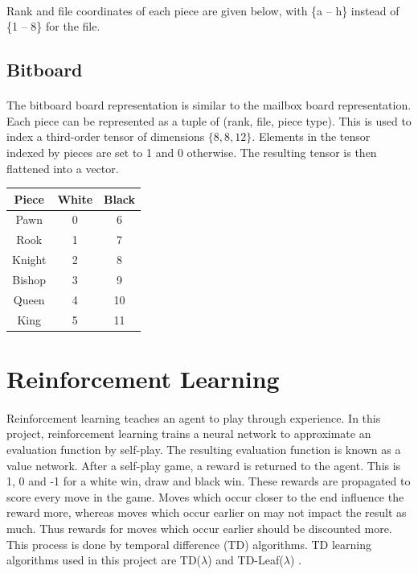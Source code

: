 \documentclass[12pt,a4paper]{book}
\begin{document}
\paragraph{} Rank and file coordinates of each piece are given below, with \{a -- h\} instead of \{1 -- 8\} for the file.

\begin{center}
  \medskip
  \newgame
  \showboard
\end{center}

\subsection{Bitboard}

\paragraph{} The bitboard board representation is similar to the mailbox board representation. Each piece can be represented as a tuple of (rank, file, piece type). This is used to index a third-order tensor of dimensions $\{8, 8, 12\}$. Elements in the tensor indexed by pieces are set to 1 and 0 otherwise. The resulting tensor is then flattened into a vector.

\begin{center}
  \begin{tabular}{c | c  c}
    \hline
    \textbf{Piece} & \textbf{White} & \textbf{Black} \\ \hline
    Pawn & 0 & 6 \\
    Rook & 1 & 7 \\
    Knight & 2 & 8 \\
    Bishop & 3 & 9 \\
    Queen & 4 & 10 \\
    King & 5 & 11 \\
    \hline
  \end{tabular}
\end{center}

\section{Reinforcement Learning}

\paragraph{} Reinforcement learning teaches an agent to play through experience. In this project, reinforcement learning trains a neural network to approximate an evaluation function by self-play. The resulting evaluation function is known as a value network. After a self-play game, a reward is returned to the agent. This is 1, 0 and -1 for a white win, draw and black win. These rewards are propagated to score every move in the game. Moves which occur closer to the end influence the reward more, whereas moves which occur earlier on may not impact the result as much. Thus rewards for moves which occur earlier should be discounted more. This process is done by temporal difference (TD) algorithms. TD learning algorithms used in this project are TD($\lambda$) \cite{TD-Gammon} and TD-Leaf($\lambda$) \cite{knightcap}.
\end{document}
